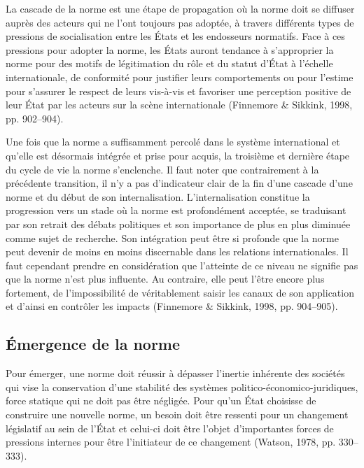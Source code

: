\documentclass[12pt]{ulaval}
\begin{document}
La cascade de la norme est une étape de propagation où la norme doit se diffuser auprès des acteurs qui ne l'ont toujours pas adoptée, à travers différents types de pressions de socialisation entre les États et les endosseurs normatifs. Face à ces pressions pour adopter la norme, les États auront tendance à s'approprier la norme pour des motifs de légitimation du rôle et du statut d'État à l'échelle internationale, de conformité pour justifier leurs comportements ou pour l'estime pour s'assurer le respect de leurs vis-à-vis et favoriser une perception positive de leur État par les acteurs sur la scène internationale (Finnemore \& Sikkink, 1998, pp. 902--904).

Une fois que la norme a suffisamment percolé dans le système international et qu'elle est désormais intégrée et prise pour acquis, la troisième et dernière étape du cycle de vie la norme s'enclenche. Il faut noter que contrairement à la précédente transition, il n'y a pas d'indicateur clair de la fin d'une cascade d'une norme et du début de son internalisation. L'internalisation constitue la progression vers un stade où la norme est profondément acceptée, se traduisant par son retrait des débats politiques et son importance de plus en plus diminuée comme sujet de recherche. Son intégration peut être si profonde que la norme peut devenir de moins en moins discernable dans les relations internationales. Il faut cependant prendre en considération que l'atteinte de ce niveau ne signifie pas que la norme n'est plus influente. Au contraire, elle peut l'être encore plus fortement, de l'impossibilité de véritablement saisir les canaux de son application et d'ainsi en contrôler les impacts (Finnemore \& Sikkink, 1998, pp. 904--905).

\subsection{Émergence de la norme}\label{uxe9mergence-de-la-norme}

Pour émerger, une norme doit réussir à dépasser l'inertie inhérente des sociétés qui vise la conservation d'une stabilité des systèmes politico-économico-juridiques, force statique qui ne doit pas être négligée. Pour qu'un État choisisse de construire une nouvelle norme, un besoin doit être ressenti pour un changement législatif au sein de l'État et celui-ci doit être l'objet d'importantes forces de pressions internes pour être l'initiateur de ce changement (Watson, 1978, pp. 330--333).
\end{document}
